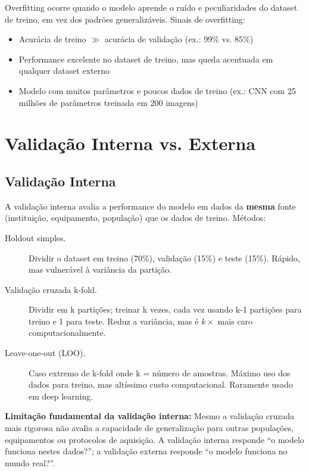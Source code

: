 Overfitting  ocorre quando o modelo aprende o ruído e peculiaridades do dataset de treino, em vez dos padrões generalizáveis. Sinais de overfitting:

\begin{itemize}
    \item Acurácia de treino $\gg$ acurácia de validação (ex.: 99\% vs. 85\%)
    \item Performance excelente no dataset de treino, mas queda acentuada em qualquer dataset externo
    \item Modelo com muitos parâmetros e poucos dados de treino (ex.: CNN com 25 milhões de parâmetros treinada em 200 imagens)
\end{itemize}

\section{Validação Interna vs. Externa}

\subsection{Validação Interna}

A validação interna  avalia a performance do modelo em dados da \textbf{mesma} fonte (instituição, equipamento, população) que os dados de treino. Métodos:

\begin{description}
    \item[Holdout simples.] Dividir o dataset em treino (70\%), validação (15\%) e teste (15\%). Rápido, mas vulnerável à variância da partição.
    \item[Validação cruzada k-fold.] Dividir em k partições; treinar k vezes, cada vez usando k-1 partições para treino e 1 para teste. Reduz a variância, mas é $k \times$ mais caro computacionalmente.
    \item[Leave-one-out (LOO).] Caso extremo de k-fold onde k = número de amostras. Máximo uso dos dados para treino, mas altíssimo custo computacional. Raramente usado em deep learning.
\end{description}

\textbf{Limitação fundamental da validação interna:} Mesmo a validação cruzada mais rigorosa não avalia a capacidade de generalização para outras populações, equipamentos ou protocolos de aquisição. A validação interna responde ``o modelo funciona nestes dados?''; a validação externa responde ``o modelo funciona no mundo real?''.

